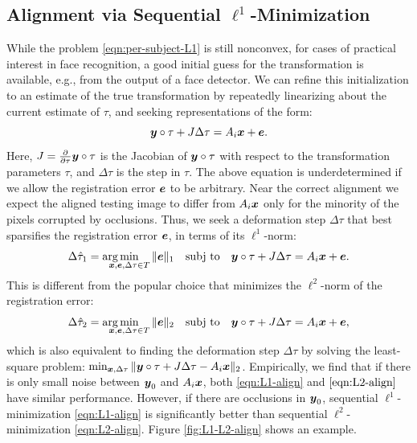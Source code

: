 \documentclass[12pt,journal,draftcls,letterpaper,onecolumn]{IEEEtran}
\newcommand{\subj}{\textup{subj to}}
\begin{document}
\subsection{Alignment via Sequential $\ell^1$-Minimization} While the problem \eqref{eqn:per-subject-L1} is still nonconvex, for cases of practical interest in face recognition, a good initial guess for the transformation is available, e.g., from the output of a face detector. We can refine this initialization to an estimate of the true transformation by repeatedly linearizing about  the current estimate of $\tau$, and seeking representations of the form:
\begin{equation}
{\boldsymbol{y}}\circ \tau + J \Delta \tau = A_i {\boldsymbol{x}} + \boldsymbol{e}.
\end{equation}
Here, $J = \frac{\partial}{\partial \tau} {\boldsymbol{y}} \circ \tau$ is the
Jacobian of ${\boldsymbol{y}} \circ \tau$ with respect to the transformation
parameters $\tau$, and $\Delta \tau$ is the step in $\tau$. The
above equation is underdetermined if we allow the registration
error $\boldsymbol{e}$ to be arbitrary. Near the correct alignment we
expect the aligned testing image to differ from $A_i {\boldsymbol{x}}$ only
for the minority of the pixels corrupted by occlusions. Thus,
we seek a deformation step $\Delta \tau$ that best sparsifies the registration error $\boldsymbol{e}$, in terms of its $\ell^1$-norm:
\begin{equation}
\Delta\hat{\tau}_1 = \arg\hspace{-3.5mm}\min_{\x,\e,\Delta\tau \in T} \| \e \|_1 \quad \subj \quad \y\circ\tau + J \Delta \tau = A_i \x + \e.
\label{eqn:L1-align}
\end{equation}
This is different from the popular choice that
minimizes the $\ell^2$-norm of the registration error:
\begin{equation}
\Delta\hat{\tau}_2 = \arg\hspace{-3.5mm}\min_{\x,\e,\Delta\tau \in T} \| \e \|_2 \quad \subj \quad \y\circ\tau + J \Delta \tau = A_i \x + \e,
\label{eqn:L2-align}
\end{equation}
which is also equivalent to finding the deformation step
$\Delta  \tau$ by solving the least-square problem:
$\min_{{\boldsymbol{x}},\Delta \tau} \|{\boldsymbol{y}} \circ \tau + J\Delta \tau - A_i {\boldsymbol{x}}
\|_2$. Empirically, we find that if there is only small noise
between ${\boldsymbol{y}}_0$ and $A_i{\boldsymbol{x}}$, both \eqref{eqn:L1-align} and
$\eqref{eqn:L2-align}$ have similar performance.  However, if
there are occlusions in ${\boldsymbol{y}}_0$, sequential
$\ell^1$-minimization \eqref{eqn:L1-align} is significantly
better than sequential $\ell^2$-minimization
\eqref{eqn:L2-align}. Figure \ref{fig:L1-L2-align} shows an
example.
\end{document}
